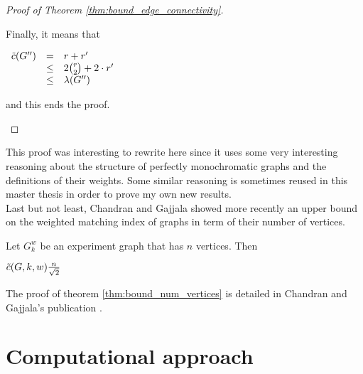 \begin{proof}[Proof of Theorem \ref{thm:bound_edge_connectivity}]
\begin{enumerate}
\begin{enumerate}
                    Finally, it means that
                    
                    \begin{center}
                        $\begin{array}{lcl}
                            \Tilde{c}(G'') & =    & r + r' \\
                                           & \leq & 2 {r \choose 2} + 2 \cdot r' \\
                                           & \leq & \lambda(G'')
                        \end{array}$
                    \end{center}
                    
                    and this ends the proof.
            \end{enumerate}
    \end{enumerate}
\end{proof}

This proof was interesting to rewrite here since it uses some very interesting reasoning about the structure of perfectly monochromatic graphs and the definitions of their weights. Some similar reasoning is sometimes reused in this master thesis in order to prove my own new results. \\

Last but not least, Chandran and Gajjala showed more recently an upper bound on the weighted matching index of graphs in term of their number of vertices. \cite{chandran2023graphtheoretic}

\begin{theorem}
    \label{thm:bound_num_vertices}
    Let $G_k^w$ be an experiment graph that has $n$ vertices. Then 
    \begin{center}
        $\Tilde{c}(G, k, w) \frac{n}{\sqrt{2}}$
    \end{center}
\end{theorem}

The proof of theorem \ref{thm:bound_num_vertices} is detailed in Chandran and Gajjala's publication \cite{chandran2023graphtheoretic}.


\section{Computational approach}